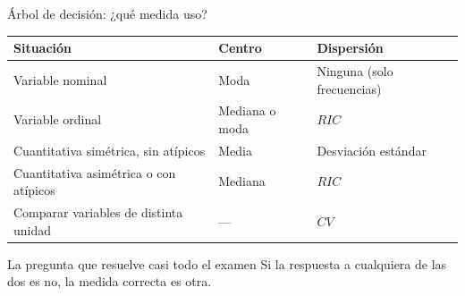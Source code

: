 \documentclass[aspectratio=169,10pt]{beamer}
\begin{document}
\begin{frame}{Árbol de decisión: ¿qué medida uso?}
  \scriptsize
  \begin{center}
  \begin{tabular}{@{}p{3.2cm}p{4.0cm}p{4.6cm}@{}}
    \toprule
    \textbf{Situación} & \textbf{Centro} & \textbf{Dispersión} \\
    \midrule
    Variable nominal & Moda & Ninguna (solo frecuencias) \\
    Variable ordinal & Mediana o moda & $RIC$ \\
    Cuantitativa simétrica, sin atípicos & Media & Desviación estándar \\
    Cuantitativa asimétrica o con atípicos & Mediana & $RIC$ \\
    Comparar variables de distinta unidad & --- & $CV$ \\
    \bottomrule
  \end{tabular}
  \end{center}

  \vspace{0.1cm}
  \begin{alertblock}{La pregunta que resuelve casi todo el examen}
    \scriptsize
    Si la respuesta a cualquiera de las dos es no, la medida correcta es otra.
  \end{alertblock}
\end{frame}

\end{document}
